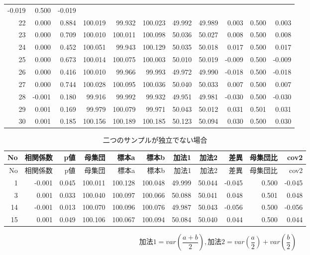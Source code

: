 \documentclass[]{tufte-handout}
\begin{document}
\begin{longtable}[]{@{}rrrrrrrrrrr@{}}
-0.019 & 0.500 & -0.019 \\
22 & 0.000 & 0.884 & 100.019 & 99.932 & 100.023 & 49.992 & 49.989 &
0.003 & 0.500 & 0.003 \\
23 & 0.000 & 0.709 & 100.010 & 100.011 & 100.098 & 50.036 & 50.027 &
0.008 & 0.500 & 0.008 \\
24 & 0.000 & 0.452 & 100.051 & 99.943 & 100.129 & 50.035 & 50.018 &
0.017 & 0.500 & 0.017 \\
25 & 0.000 & 0.673 & 100.014 & 100.075 & 100.003 & 50.010 & 50.019 &
-0.009 & 0.500 & -0.009 \\
26 & 0.000 & 0.416 & 100.010 & 99.966 & 99.993 & 49.972 & 49.990 &
-0.018 & 0.500 & -0.018 \\
27 & 0.000 & 0.744 & 100.028 & 100.095 & 100.036 & 50.040 & 50.033 &
0.007 & 0.500 & 0.007 \\
28 & -0.001 & 0.180 & 99.916 & 99.992 & 99.932 & 49.951 & 49.981 &
-0.030 & 0.500 & -0.030 \\
29 & 0.001 & 0.169 & 99.979 & 100.079 & 99.971 & 50.043 & 50.012 & 0.031
& 0.501 & 0.031 \\
30 & 0.001 & 0.185 & 100.156 & 100.189 & 100.185 & 50.123 & 50.094 &
0.030 & 0.500 & 0.030 \\
\bottomrule
\end{longtable}

\begin{longtable}[]{@{}rrrrrrrrrrr@{}}
\caption{二つのサンプルが独立でない場合}\tabularnewline
\toprule
No & 相関係数 & p値 & 母集団 & 標本a & 標本b & 加法1 & 加法2 & 差異 &
母集団比 & cov2 \\
\midrule
\endfirsthead
\toprule
No & 相関係数 & p値 & 母集団 & 標本a & 標本b & 加法1 & 加法2 & 差異 &
母集団比 & cov2 \\
\midrule
\endhead
1 & -0.001 & 0.045 & 100.011 & 100.128 & 100.048 & 49.999 & 50.044 &
-0.045 & 0.500 & -0.045 \\
3 & 0.001 & 0.033 & 100.040 & 100.097 & 100.066 & 50.088 & 50.041 &
0.048 & 0.501 & 0.048 \\
14 & -0.001 & 0.013 & 100.070 & 100.096 & 100.076 & 49.987 & 50.043 &
-0.056 & 0.500 & -0.056 \\
15 & 0.001 & 0.049 & 100.106 & 100.067 & 100.094 & 50.084 & 50.040 &
0.044 & 0.500 & 0.044 \\
\bottomrule
\end{longtable}

\[\mbox{加法1} = var(\frac{a + b}{2}),　\mbox{加法2} = var(\frac{a}{2}) + var(\frac{b}{2})\]
\end{document}
